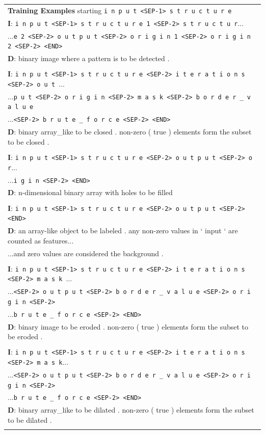 \begin{table}
\begin{center}
\begin{tabular}{l}
\textbf{Training Examples} starting \texttt{i n p u t <SEP-1> s t r u c t u r e}\\
\textbf{I}: \texttt{i n p u t <SEP-1> s t r u c t u r e 1 <SEP-2> s t r u c t u r}...\\
...\texttt{e 2 <SEP-2> o u t p u t <SEP-2> o r i g i n 1 <SEP-2> o r i g i n 2 <SEP-2> <END>}\\
\textbf{D}: binary image where a pattern is to be detected .\\
\\
\textbf{I}: \texttt{i n p u t <SEP-1> s t r u c t u r e <SEP-2> i t e r a t i o n s <SEP-2> o u t }...\\
...\texttt{p u t <SEP-2> o r i g i n <SEP-2> m a s k <SEP-2> b o r d e r _ v a l u e }\\
...\texttt{<SEP-2> b r u t e _ f o r c e <SEP-2> <END>}\\
\textbf{D}: binary array\_like to be closed . non-zero ( true ) elements form the subset to be closed .\\
\\
\textbf{I}: \texttt{i n p u t <SEP-1> s t r u c t u r e <SEP-2> o u t p u t <SEP-2> o r}...\\
...\texttt{i g i n <SEP-2> <END>}\\
\textbf{D}: n-dimensional binary array with holes to be filled\\
\\
\textbf{I}: \texttt{i n p u t <SEP-1> s t r u c t u r e <SEP-2> o u t p u t <SEP-2> <END>}\\
\textbf{D}: an array-like object to be labeled . any non-zero values in ` input ` are counted as features...\\
...and zero values are considered the background .\\
\\
\textbf{I}: \texttt{i n p u t <SEP-1> s t r u c t u r e <SEP-2> i t e r a t i o n s <SEP-2> m a s k }...\\
...\texttt{<SEP-2> o u t p u t <SEP-2> b o r d e r _ v a l u e <SEP-2> o r i g i n <SEP-2>}\\
...\texttt{b r u t e _ f o r c e <SEP-2> <END>}\\
\textbf{D}: binary image to be eroded . non-zero ( true ) elements form the subset to be eroded .\\
\\
\textbf{I}: \texttt{i n p u t <SEP-1> s t r u c t u r e <SEP-2> i t e r a t i o n s <SEP-2> m a s k}...\\
...\texttt{<SEP-2> o u t p u t <SEP-2> b o r d e r _ v a l u e <SEP-2> o r i g i n <SEP-2>}\\
...\texttt{b r u t e _ f o r c e <SEP-2> <END>}\\
\textbf{D}: binary array\_like to be dilated . non-zero ( true ) elements form the subset to be dilated .\\
\\




\end{tabular}
\end{center}
\end{table}
